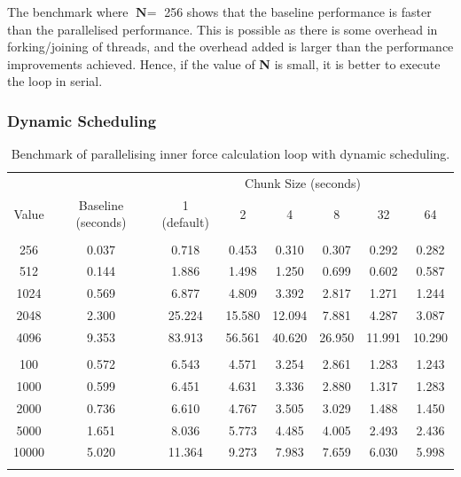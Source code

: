 \documentclass[12pt, a4paper]{article}
\begin{document}
The benchmark where \(\textbf{N} =\) 256 shows that the baseline performance is faster than the
parallelised performance. This is possible as there is some overhead in forking/joining of threads,
and the overhead added is larger than the performance improvements achieved. Hence, if the value of
\textbf{N} is small, it is better to execute the loop in serial.

\subsubsection{Dynamic Scheduling} \label{subsec:force_loop_dynamic}
\renewcommand{\arraystretch}{1.3}
\begin{longtable}{|c|c|c|c|c|c|c|c|}
  \hline \endfirsthead
  & & \multicolumn{6}{c|}{Chunk Size (seconds)} \\ \cline{3-8}
  \multirow{-2}{*}{Value} & \multirow{-2}{*}{Baseline (seconds)}
  & 1 (default) & 2 & 4 & 8 & 32 & 64 \\ \hline
  \rowcolor{lightgray} \multicolumn{8}{|c|}{\textbf{Number of Bodies (N)}} \\ \hline
  256  & \cellcolor{green}0.037 & 0.718  & 0.453  & 0.310  & 0.307 & 0.292 & 0.282 \\
  512  & \cellcolor{green}0.144 & 1.886  & 1.498  & 1.250  & 0.699 & 0.602 & 0.587 \\
  1024 & \cellcolor{green}0.569 & 6.877  & 4.809  & 3.392  & 2.817 & 1.271 & 1.244 \\
  2048 & \cellcolor{green}2.300 & 25.224 & 15.580 & 12.094 & 7.881 & 4.287 & 3.087 \\
  4096 & \cellcolor{green}9.353 & 83.913 & 56.561 & 40.620 & 26.950 & 11.991 & 10.290 \\ \hline
  \rowcolor{lightgray} \multicolumn{8}{|c|}{\textbf{Activity Grid Dimension (D)}} \\ \hline
  100   & \cellcolor{green}0.572 & 6.543  & 4.571 & 3.254 & 2.861 & 1.283 & 1.243 \\
  1000  & \cellcolor{green}0.599 & 6.451  & 4.631 & 3.336 & 2.880 & 1.317 & 1.283 \\
  2000  & \cellcolor{green}0.736 & 6.610  & 4.767 & 3.505 & 3.029 & 1.488 & 1.450 \\
  5000  & \cellcolor{green}1.651 & 8.036  & 5.773 & 4.485 & 4.005 & 2.493 & 2.436 \\
  10000 & \cellcolor{green}5.020 & 11.364 & 9.273 & 7.983 & 7.659 & 6.030 & 5.998 \\ \hline
  \caption{Benchmark of parallelising inner force calculation loop with dynamic scheduling.}
  \label{table:force_loop_dynamic}
\end{longtable}
\renewcommand{\arraystretch}{1}
\end{document}
